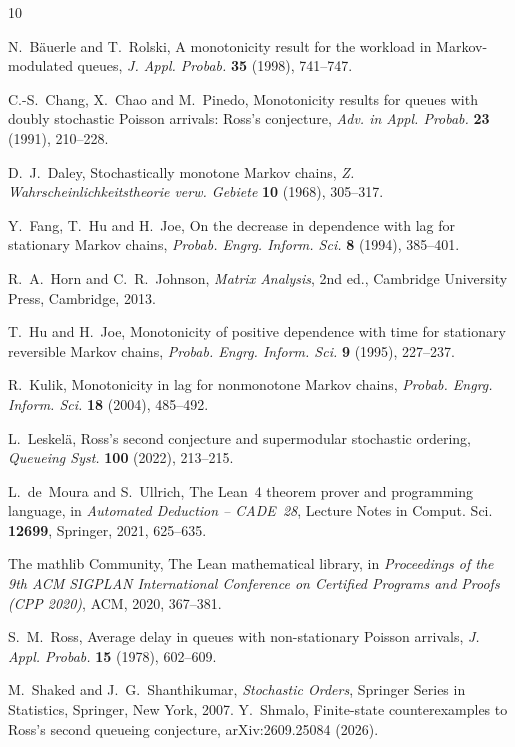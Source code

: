 \documentclass[11pt]{amsart}
\theoremstyle{remark}
\numberwithin{equation}{section}
\newcommand{\1}{\mathbf 1}
\begin{document}
\begin{thebibliography}{10}

N.~B\"auerle and T.~Rolski, A monotonicity result for the workload in Markov-modulated queues, \emph{J. Appl. Probab.} \textbf{35} (1998), 741--747.

C.-S.~Chang, X.~Chao and M.~Pinedo, Monotonicity results for queues with doubly stochastic Poisson arrivals: Ross's conjecture, \emph{Adv. in Appl. Probab.} \textbf{23} (1991), 210--228.

D.~J.~Daley, Stochastically monotone Markov chains, \emph{Z. Wahrscheinlichkeitstheorie verw. Gebiete} \textbf{10} (1968), 305--317.

Y.~Fang, T.~Hu and H.~Joe, On the decrease in dependence with lag for stationary Markov chains, \emph{Probab. Engrg. Inform. Sci.} \textbf{8} (1994), 385--401.

R.~A.~Horn and C.~R.~Johnson, \emph{Matrix Analysis}, 2nd ed., Cambridge University Press, Cambridge, 2013.

T.~Hu and H.~Joe, Monotonicity of positive dependence with time for stationary reversible Markov chains, \emph{Probab. Engrg. Inform. Sci.} \textbf{9} (1995), 227--237.

R.~Kulik, Monotonicity in lag for nonmonotone Markov chains, \emph{Probab. Engrg. Inform. Sci.} \textbf{18} (2004), 485--492.

L.~Leskel\"a, Ross's second conjecture and supermodular stochastic ordering, \emph{Queueing Syst.} \textbf{100} (2022), 213--215.

L.~de~Moura and S.~Ullrich, The Lean~4 theorem prover and programming language, in \emph{Automated Deduction -- CADE~28}, Lecture Notes in Comput. Sci. \textbf{12699}, Springer, 2021, 625--635.

The mathlib Community, The Lean mathematical library, in \emph{Proceedings of the 9th ACM SIGPLAN International Conference on Certified Programs and Proofs (CPP 2020)}, ACM, 2020, 367--381.

S.~M.~Ross, Average delay in queues with non-stationary Poisson arrivals, \emph{J. Appl. Probab.} \textbf{15} (1978), 602--609.

M.~Shaked and J.~G.~Shanthikumar, \emph{Stochastic Orders}, Springer Series in Statistics, Springer, New York, 2007.
Y.~Shmalo, Finite-state counterexamples to Ross's second queueing conjecture, arXiv:2609.25084 (2026).


\end{thebibliography}
\end{document}
